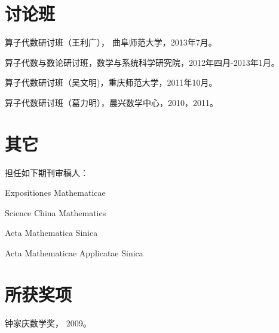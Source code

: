 \documentclass[letterpaper]{article}
\renewenvironment{itemize}{
  \begin{list}{}{
    \setlength{\leftmargin}{1.5em}
  }
}{
  \end{list}
}
\begin{document}
\section*{讨论班}
\begin{itemize}
  \item 算子代数研讨班（王利广）， 曲阜师范大学，2013年7月。
  \item 算子代数与数论研讨班，数学与系统科学研究院，2012年四月-2013年1月。
  \item 算子代数研讨班（吴文明)，重庆师范大学，2011年10月。
  \item 算子代数研讨班（葛力明），晨兴数学中心，2010，2011。
  \end{itemize}

\section*{其它}
担任如下期刊审稿人： 
\begin{itemize}
  \item Expositiones Mathematicae
  \item Science China Mathematics 
  \item Acta Mathematica Sinica 
  \item Acta Mathematicae Applicatae Sinica
\end{itemize}

\section*{所获奖项}
\begin{itemize}
  \item 钟家庆数学奖， 2009。
\end{itemize}


\bigskip
\end{document}
